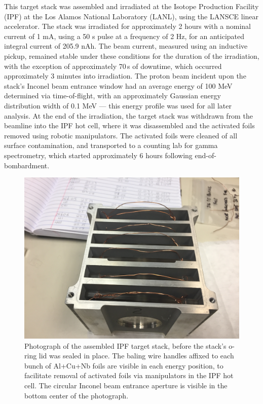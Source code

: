 This target stack was assembled and irradiated at the Isotope Production Facility (IPF) at the Los Alamos National Laboratory (LANL), using the LANSCE linear accelerator. 
The stack was irradiated for approximately 2 hours with a nominal current of 1 mA, using a 50 \mmicro s pulse at a frequency of 2 Hz, for an anticipated integral current of 205.9 nAh.
The beam current, measured using an inductive pickup, remained stable under these conditions for the duration of the irradiation, with the exception of approximately 70\,s of downtime, which occurred approximately 3 minutes into irradiation.
The proton beam incident upon the stack's Inconel beam entrance window had an average energy of 100 MeV determined via time-of-flight, with an approximately Gaussian energy distribution width of 0.1 MeV --- this energy profile was used for all later analysis.
At the end of the irradiation, the target stack was withdrawn from the beamline into the IPF hot cell, where it was disassembled and the activated foils removed using robotic manipulators.
The activated foils were cleaned of all surface contamination, and transported to a counting lab for gamma spectrometry, which started approximately 6 hours following end-of-bombardment.





\begin{figure}
 \centering
 \includegraphics[width=0.5\linewidth,clip=true,trim=13cm 0cm 3cm 6cm]{./figures/IMG_1975.JPG}
 \caption{\label{fig:target_stack}Photograph of the assembled IPF target stack, before the stack's o-ring lid was sealed in place. The baling wire handles affixed to each bunch of Al+Cu+Nb foils are visible in each energy position, to facilitate removal of activated foils via  manipulators in the IPF hot cell. The circular Inconel beam entrance aperture is visible in the bottom center of the photograph.  }
\end{figure}




